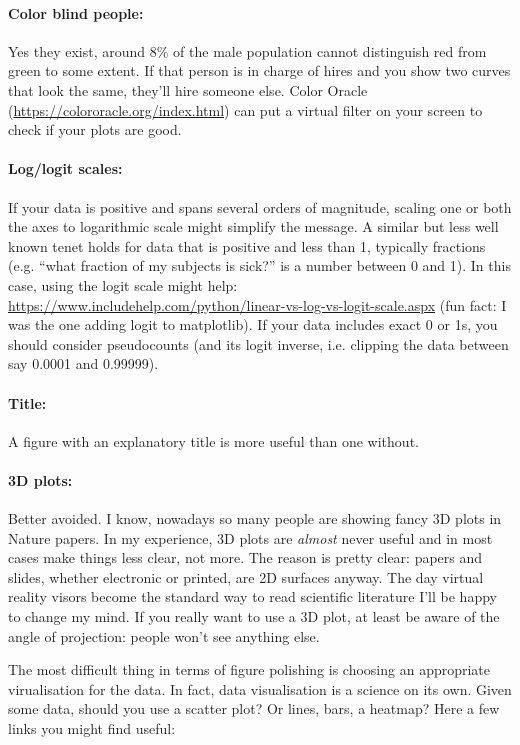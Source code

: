 \documentclass[12pt,a4paper,notitlepage,onecolumn]{article}
\begin{document}
\paragraph{Color blind people:} Yes they exist, around 8\% of the male population cannot distinguish red from green to some extent. If that person is in charge of hires and you show two curves that look the same, they'll hire someone else. Color Oracle (\url{https://colororacle.org/index.html}) can put a virtual filter on your screen to check if your plots are good.

\paragraph{Log/logit scales:} If your data is positive and spans several orders of magnitude, scaling one or both the axes to logarithmic scale might simplify the message. A similar but less well known tenet holds for data that is positive and less than 1, typically fractions (e.g. ``what fraction of my subjects is sick?'' is a number between 0 and 1). In this case, using the logit scale might help: \url{https://www.includehelp.com/python/linear-vs-log-vs-logit-scale.aspx} (fun fact: I was the one adding logit to matplotlib). If your data includes exact 0 or 1s, you should consider pseudocounts (and its logit inverse, i.e. clipping the data between say 0.0001 and 0.99999).

\paragraph{Title:} A figure with an explanatory title is more useful than one without.

\paragraph{3D plots:} Better avoided. I know, nowadays so many people are showing fancy 3D plots in Nature papers. In my experience, 3D plots are \textit{almost} never useful and in most cases make things less clear, not more. The reason is pretty clear: papers and slides, whether electronic or printed, are 2D surfaces anyway. The day virtual reality visors become the standard way to read scientific literature I'll be happy to change my mind. If you really want to use a 3D plot, at least be aware of the angle of projection: people won't see anything else.

The most difficult thing in terms of figure polishing is choosing an appropriate virualisation for the data. In fact, data visualisation is a science on its own. Given some data, should you use a scatter plot? Or lines, bars, a heatmap? Here a few links you might find useful:
 
\end{document}
